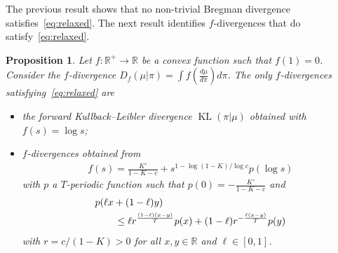 \documentclass{article}
\newcommand{\KL}{\mathop{\mathrm{KL}}\nolimits}
\newcommand{\R}{\mathbb R}
\newtheorem{proposition}{Proposition}
\begin{document}
The previous result shows that no non-trivial Bregman divergence  satisfies~\eqref{eq:relaxed}. The next result identifies $f$-divergences that do satisfy~\eqref{eq:relaxed}.

\begin{proposition}
\label{prop:fdiv}
Let $f:
\R^+\to \R$ be a convex function such that $f(1)=0$. Consider the $f$-divergence
$D_f(\mu | \pi)= \int f\left(\frac{d\mu}{d\pi}\right) d\pi$.
The only $f$-divergences satisfying~\eqref{eq:relaxed} are
\begin{itemize}
    \item the forward Kullback--Leibler divergence $\KL(\pi|\mu)$ obtained with $f(s) = \log s$;
    \item $f$-divergences obtained from 
    \begin{align*}
    f(s)= \frac{K'}{1-K-c} + s^{1-\log (1-K)/\log c} p(\log s)
\end{align*}
with $p$ a $T$-periodic function such that $p(0) = -\frac{K'}{1-K-c}$ and
\begin{align}
\label{eq:p_condition}
&p(\ell x+(1-\ell)y)\\
&\qquad\le
\ell r^{\frac{(1-\ell)(x-y)}{T}}p(x)
+
(1-\ell)r^{-\frac{\ell(x-y)}{T}}p(y)\notag
\end{align}
with $r=c/(1-K)>0$ for all $x, y\in\R$ and $\ell\in[0, 1]$.
\end{itemize}
\end{proposition}
\end{document}
